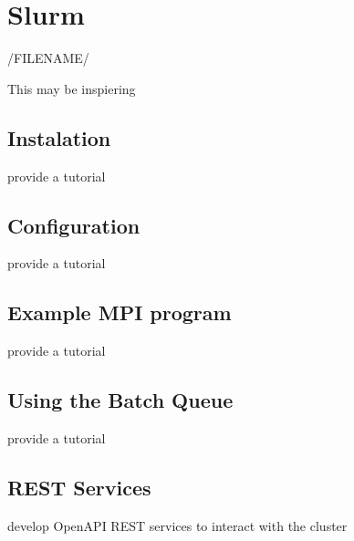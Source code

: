\chapter{Slurm}

/FILENAME/

This may be inspiering 



\section{Instalation}

\begin{exercise}
provide a tutorial 
\end{exercise}

\section{Configuration}

\begin{exercise}
provide a tutorial 
\end{exercise}

\section{Example MPI program}

\begin{exercise}
provide a tutorial 
\end{exercise}

\section{Using the Batch Queue}

\begin{exercise}
provide a tutorial 
\end{exercise}

\section{REST Services}

\begin{exercise}
develop OpenAPI REST services to interact with the cluster
\end{exercise}




